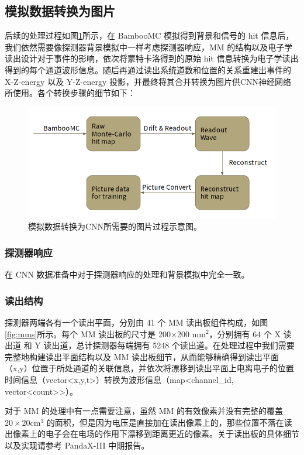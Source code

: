 \subsection{模拟数据转换为图片}

后续的处理过程如图\ref{fig:process}所示，在 BambooMC 模拟得到背景和信号的 hit 信息后，我们依然需要像探测器背景模拟中一样考虑探测器响应，MM 的结构以及电子学读出设计对于事件的影响，依次将蒙特卡洛得到的原始 hit 信息转换为电子学读出得到的每个通道波形信息。随后再通过读出系统道数和位置的关系重建出事件的 X-Z-energy 以及 Y-Z-energy 投影，并最终将其合并转换为图片供CNN神经网络所使用。各个转换步骤的细节如下：

\begin{figure}
    \centering
    \includegraphics[width=0.6\columnwidth]{pic/process.png}
    \caption{模拟数据转换为CNN所需要的图片过程示意图。}
    \label{fig:process}
\end{figure}

\subsubsection{探测器响应}

    在 CNN 数据准备中对于探测器响应的处理和背景模拟中完全一致。

\subsubsection{读出结构}

    探测器两端各有一个读出平面，分别由 41 个 MM 读出板组件构成，如图\ref{fig:mms}所示。每个 MM 读出板的尺寸是 200$\times$200 mm$^2$，分别拥有 64 个 X 读出道 和 Y 读出道，总计探测器每端拥有 5248 个读出道。在处理过程中我们需要完整地构建读出平面结构以及 MM 读出板细节，从而能够精确得到读出平面（x,y）位置于所处通道的关联信息，并依次将漂移到读出平面上电离电子的位置时间信息（vector<x,y,t>）转换为波形信息（map<channel\_id, vector<count>>）。

    对于 MM 的处理中有一点需要注意，虽然 MM 的有效像素并没有完整的覆盖 $20\times20$cm$^3$ 的面积，但是因为电压是直接加在读出像素上的，那些位置不落在读出像素上的电子会在电场的作用下漂移到距离更近的像素。关于读出板的具体细节以及实现请参考 PandaX-III 中期报告\supercite{cdr}。

